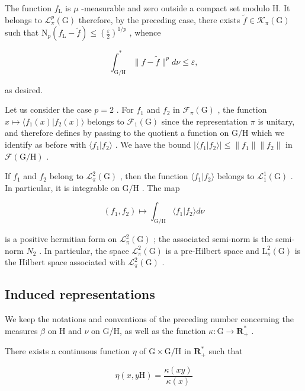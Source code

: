 The function \(f_{\mathrm{L}}\) is \(\mu\) -measurable and zero outside a compact set modulo H. It belongs to \(\mathcal{L}_{\pi}^{p}(\mathrm{G})\) therefore, by the preceding case, there exists \(\widetilde{f} \in \mathcal{K}_{\pi}(\mathrm{G})\) such that \(\mathrm{N}_p(f_{\mathrm{L}} - \widetilde{f}) \leqslant (\frac{\varepsilon}{2})^{1/p}\) , whence

\[
\int_ {\mathrm{G/H}} ^ {*} \| f - \widetilde {f} \| ^ {p} d \nu \leqslant \varepsilon ,
\]

as desired.

 Let us consider the case \(p = 2\) . For \(f_1\) and \(f_2\) in \(\mathcal{F}_{\pi}(\mathrm{G})\) , the function \(x \mapsto \langle f_1(x) | f_2(x) \rangle\) belongs to \(\mathcal{F}_1(\mathrm{G})\) since the representation \(\pi\) is unitary, and therefore defines by passing to the quotient a function on \(\mathrm{G / H}\) which we identify as before with \(\langle f_1 | f_2 \rangle\) . We have the bound \(|\langle f_1 | f_2 \rangle| \leqslant \| f_1 \| \| f_2 \|\) in \(\mathcal{F}(\mathrm{G / H})\) .

If \(f_1\) and \(f_2\) belong to \(\mathcal{L}_\pi^2(\mathrm{G})\) , then the function \(\langle f_1 | f_2 \rangle\) belongs to \(\mathcal{L}_1^1(\mathrm{G})\) . In particular, it is integrable on \(\mathrm{G/H}\) . The map

\[
(f _ {1}, f _ {2}) \mapsto \int_ {\mathrm{G} / \mathrm{H}} \langle f _ {1} | f _ {2} \rangle d \nu
\]

is a positive hermitian form on \(\mathcal{L}_{\pi}^{2}(\mathrm{G})\) ; the associated semi-norm is the semi-norm \(N_{2}\) . In particular, the space \(\mathcal{L}_{\pi}^{2}(\mathrm{G})\) is a pre-Hilbert space and \(\mathrm{L}_{\pi}^{2}(\mathrm{G})\) is the Hilbert space associated with \(\mathcal{L}_{\pi}^{2}(\mathrm{G})\) .

\subsection{Induced representations}

We keep the notations and conventions of the preceding number concerning the measures \(\beta\) on H and \(\nu\) on G/H, as well as the function \(\kappa\colon\mathrm{G}\to\mathbf{R}_{+}^{*}\) .

There exists a continuous function \(\eta\) of \(\mathrm{G} \times \mathrm{G} / \mathrm{H}\) in \(\mathbf{R}_{+}^{*}\) such that

\[
\eta (x, y \mathrm{H}) = \frac {\kappa (x y)}{\kappa (x)}
\]

